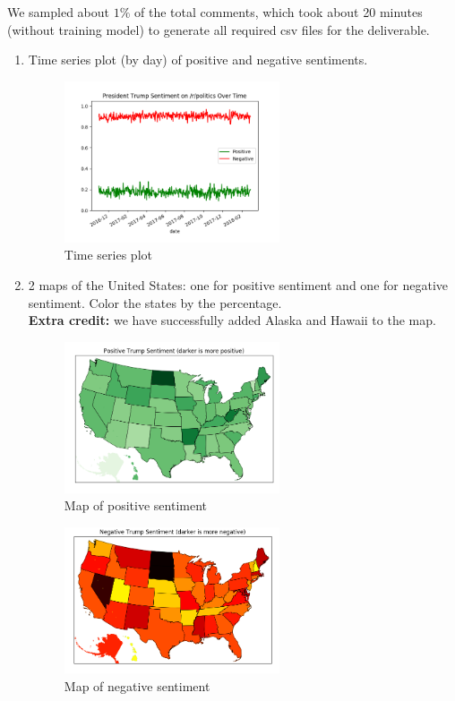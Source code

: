 \documentclass{article}
\newcommand{\percent}{$1\%$ }
\begin{document}
\setlength{\abovedisplayskip}{2.5pt}
\setlength{\belowdisplayskip}{2.5pt}

We sampled about \percent of the total comments, which took about 20 minutes (without training model) to generate all required csv files for the deliverable.
\begin{enumerate}
\item Time series plot (by day) of positive and negative sentiments.
\begin{figure}[!ht]
\centering
\caption{Time series plot}
\includegraphics[width=0.6\textwidth]{part1.png}	
\end{figure}

\item 2 maps of the United States: one for positive sentiment and one for negative sentiment. Color the states by the percentage.  \\
\textbf{Extra credit:} we have successfully added Alaska and Hawaii to the map.
\begin{figure}[!ht]\centering
\caption{Map of positive sentiment}
\includegraphics[width=0.6\textwidth]{posmap.png}	
\end{figure}
\newpage
\begin{figure}[!ht]\centering
\caption{Map of negative sentiment}
\includegraphics[width=0.6\textwidth]{negmap}	
\end{figure}



\end{enumerate}
\end{document}
